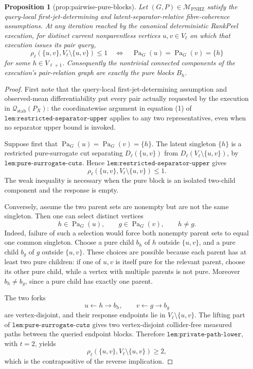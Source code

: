 \documentclass{article}
\newtheorem{proposition}{Proposition}
\begin{document}
\begin{proposition}[prop:pairwise-pure-blocks]\label{prop:pairwise-pure-blocks}
Let \((G,P)\in\mathcal M_{\mathrm{PNHZ}}\) satisfy the query-local first-jet-determining and latent-separator-relative fibre-coherence assumptions.  At any iteration reached by the canonical deterministic RankPeel execution, for distinct current nonparentless vertices \(u,v\in V_\ell\) on which that execution issues its pair query,
\[
 \rho_\ell(\{u,v\},V_\ell\setminus\{u,v\})\leq1
 \quad\Longleftrightarrow\quad
 \operatorname{Pa}_G(u)=\operatorname{Pa}_G(v)=\{h\}
\]
for some \(h\in V_{\ell+1}\).  Consequently the nontrivial connected components of the execution's pair-relation graph are exactly the pure blocks \(B_h\).
\end{proposition}
\begin{proof}
First note that the query-local first-jet-determining assumption and observed-mean differentiability put every pair actually requested by the execution in \(\mathcal Q_{\mathrm{stab}}(P_X)\): the coordinatewise argument in equation (1) of \(\texttt{lem:restricted-separator-upper}\) applies to any two representatives, even when no separator upper bound is invoked.

Suppose first that \(\operatorname{Pa}_G(u)=\operatorname{Pa}_G(v)=\{h\}\).  The latent singleton \(\{h\}\) is a restricted pure-surrogate cut separating \(D_\ell(\{u,v\})\) from \(D_\ell(V_\ell\setminus\{u,v\})\), by \(\texttt{lem:pure-surrogate-cuts}\).  Hence \(\texttt{lem:restricted-separator-upper}\) gives
\[
 \rho_\ell(\{u,v\},V_\ell\setminus\{u,v\})\leq1. \tag{1}
\]
The weak inequality is necessary when the pure block is an isolated two-child component and the response is empty.

Conversely, assume the two parent sets are nonempty but are not the same singleton.  Then one can select distinct vertices
\[
 h\in\operatorname{Pa}_G(u),
 \qquad
 g\in\operatorname{Pa}_G(v),
 \qquad h\neq g. \tag{2}
\]
Indeed, failure of such a selection would force both nonempty parent sets to equal one common singleton.  Choose a pure child \(b_h\) of \(h\) outside \(\{u,v\}\), and a pure child \(b_g\) of \(g\) outside \(\{u,v\}\).  These choices are possible because each parent has at least two pure children: if one of \(u,v\) is itself pure for the relevant parent, choose its other pure child, while a vertex with multiple parents is not pure.  Moreover \(b_h\neq b_g\), since a pure child has exactly one parent.

The two forks
\[
 u\leftarrow h\to b_h,
 \qquad
 v\leftarrow g\to b_g \tag{3}
\]
are vertex-disjoint, and their response endpoints lie in \(V_\ell\setminus\{u,v\}\).  The lifting part of \(\texttt{lem:pure-surrogate-cuts}\) gives two vertex-disjoint collider-free measured paths between the queried endpoint blocks.  Therefore \(\texttt{lem:private-path-lower}\), with \(t=2\), yields
\[
 \rho_\ell(\{u,v\},V_\ell\setminus\{u,v\})\geq2, \tag{4}
\]
which is the contrapositive of the reverse implication.


\end{proof}
\end{document}
